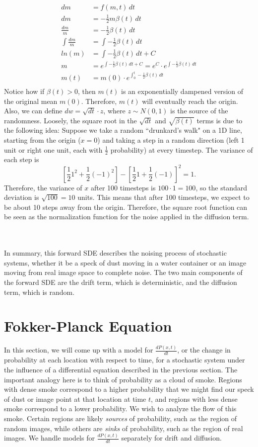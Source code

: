 \documentclass{article}
\begin{document}
\begin{align*}
    dm&=f(m,t)\,dt\\
    dm&=-\frac{1}{2}m\beta(t)\,dt\\
    \frac{dm}{m}&=-\frac{1}{2}\beta(t)\,dt\\
    \int\frac{dm}{m}&=\int-\frac{1}{2}\beta(t)\,dt\\
    ln(m)&=\int-\frac{1}{2}\beta(t)\,dt+C\\
    m&=e^{\int-\frac{1}{2}\beta(t)\,dt+C}=e^C\cdot e^{\int-\frac{1}{2}\beta(t)\,dt}\\
    m(t)&=m(0)\cdot e^{\int_0^t-\frac{1}{2}\beta(t)\,dt}\\
\end{align*}
Notice how if $\beta(t)>0$, then $m(t)$ is an exponentially dampened version of the original mean $m(0)$. Therefore, $m(t)$ will eventually reach the origin. Also, we can define $dw=\sqrt{dt}\cdot z$, where $z\sim N(0,1)$ is the source of the randomness. Loosely, the square root in the $\sqrt{dt}$ and $\sqrt{\beta(t)}$ terms is due to the following idea: Suppose we take a random ``drunkard's walk" on a 1D line, starting from the origin ($x=0$) and taking a step in a random direction (left 1 unit or right one unit, each with $\frac{1}{2}$ probability) at every timestep. The variance of each step is 
\[\left[\frac{1}{2}1^2+\frac{1}{2}(-1)^2\right]-\left[\frac{1}{2}1+\frac{1}{2}(-1)\right]^2=1.\]
Therefore, the variance of $x$ after 100 timesteps is $100\cdot 1 = 100$, so the standard deviation is $\sqrt{100}=10$ units. This means that after 100 timesteps, we expect to be about 10 steps away from the origin. Therefore, the square root function can be seen as the normalization function for the noise applied in the diffusion term. 


\\
\\
In summary, this forward SDE describes the noising process of stochastic systems, whether it be a speck of dust moving in a water container or an image moving from real image space to complete noise. The two main components of the forward SDE are the drift term, which is deterministic, and the diffusion term, which is random. 

\section{Fokker-Planck Equation}
In this section, we will come up with a model for $\frac{dP(x,t)}{dt}$, or the change in probability at each location with respect to time, for a stochastic system under the influence of a differential equation described in the previous section. The important analogy here is to think of probability as a cloud of smoke. Regions with dense smoke correspond to a higher probability that we might find our speck of dust or image point at that location at time $t$, and regions with less dense smoke correspond to a lower probability. We wish to analyze the flow of this smoke. Certain regions are likely \textit{sources} of probability, such as the region of random images, while others are \textit{sinks} of probability, such as the region of real images. We handle models for $\frac{dP(x,t)}{dt}$ separately for drift and diffusion.
\end{document}
